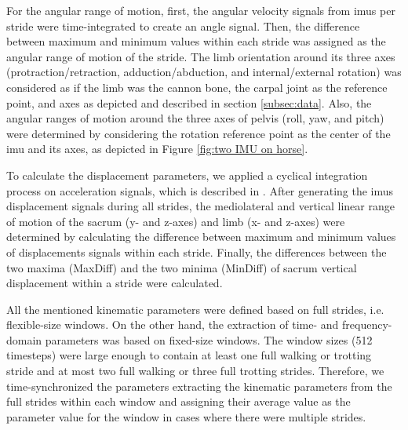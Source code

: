 

For the angular range of motion, first, the angular velocity signals from \gls{imu}s per stride were time-integrated to create an angle signal. Then, the difference between maximum and minimum values within each stride was assigned as the angular range of motion of the stride. The limb orientation around its three axes (protraction/retraction, adduction/abduction, and internal/external rotation) was considered as if the limb was the cannon bone, the carpal joint as the reference point, and axes as depicted and described in section \ref{subsec:data}. Also, the angular ranges of motion around the three axes of pelvis (roll, yaw, and pitch) were determined by considering the rotation reference point as the center of the \gls{imu} and its axes, as depicted in Figure \ref{fig:two IMU on horse}. 

To calculate the displacement parameters, we applied a cyclical integration process on acceleration signals, which is described in \cite{pfau_2005_a}. After generating the \gls{imu}s displacement signals during all strides, the mediolateral and vertical linear range of motion of the sacrum (y- and z-axes) and limb (x- and z-axes) were determined by calculating the difference between maximum and minimum values of displacements signals within each stride. Finally, the differences between the two maxima (MaxDiff) and the two minima (MinDiff) of sacrum vertical displacement within a stride were calculated. 

All the mentioned kinematic parameters were defined based on full strides, i.e. flexible-size windows. On the other hand, the extraction of time- and frequency-domain parameters was based on fixed-size windows. The window sizes (512 timesteps) were large enough to contain at least one full walking or trotting stride and at most two full walking or three full trotting strides. Therefore, we time-synchronized the parameters extracting the kinematic parameters from the full strides within each window and assigning their average value as the parameter value for the window in cases where there were multiple strides.


